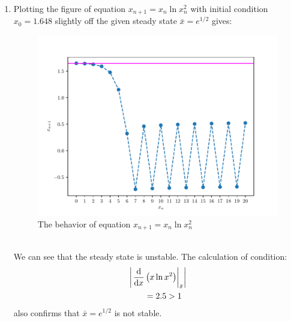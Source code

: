 \begin{homeworkProblem}[2]
\begin{enumerate}
\item Plotting the figure of equation $x_{n+1} = x_n \ln x_n^2$ with initial 
condition $x_0 = 1.648$ slightly off the given steady state $\bar x = e^{1/2}$ 
gives:
\begin{figure}
    \centering
    \caption{The behavior of equation $x_{n+1} = x_n \ln x_n^2$}
    \includegraphics[scale=0.6]{../fig/fig2(d)}
\end{figure}
\\
We can see that the steady state is unstable. The calculation of condition:
\[
    \begin{aligned}
        &\left|\left.\frac{\mathrm{d}}{\mathrm{d}x} \left(x\ln x^2\right)\right|_{\bar x}\right|\\
        &\qquad = 2.5 > 1
    \end{aligned}
\]
also confirms that $\bar x = e^{1/2}$ is not stable.
\end{enumerate}
\end{homeworkProblem}